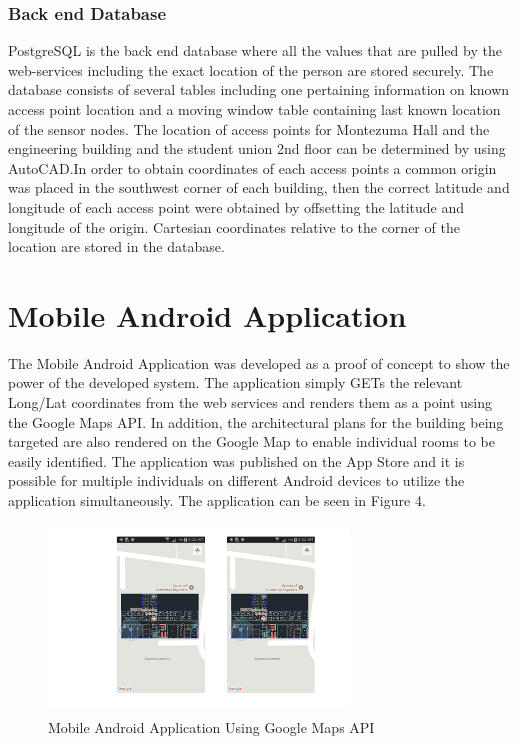 \documentclass[conference]{IEEEtran}
\begin{document}
\subsubsection{Back end Database}
PostgreSQL is the back end database where all the values that are pulled by the web-services including the exact location of the person are stored securely. The database consists of several tables including one pertaining information on known access point location and a moving window table containing last known location of the sensor nodes. The location of access points for Montezuma Hall and the engineering building and the student union 2nd floor can be determined by using AutoCAD.In order to obtain coordinates of each access points a common origin was placed in the southwest corner of each building, then the correct latitude and longitude of each access point were obtained by offsetting the latitude and longitude of the origin. Cartesian coordinates relative to the corner of the location are stored in the database.
\newline

\section{Mobile Android Application}
 The Mobile Android Application was developed as a proof of concept to show the power of the developed system. The application simply GETs the relevant Long/Lat coordinates from the web services and renders them as a point using the Google Maps API. In addition, the architectural plans for the building being targeted are also rendered on the Google Map to enable individual rooms to be easily identified. The application was published on the App Store and it is possible for multiple individuals on different Android devices to utilize the application simultaneously. The application can be seen in Figure 4.
\begin{figure}[H]
    \includegraphics[width=8cm,height=5cm]{2018-05-10-PHOTO-00000078.png}
    \caption{Mobile Android Application Using Google Maps API}
    \end{figure}
\end{document}
